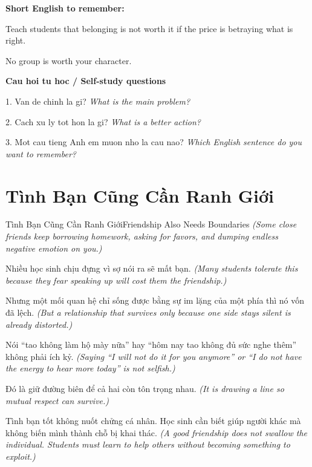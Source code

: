 \begin{ghinhoanh}
\textbf{Short English to remember:}

Teach students that belonging is not worth it if the price is betraying what is right.

No group is worth your character.

\end{ghinhoanh}

\begin{tuhocnhanh}
\textbf{Cau hoi tu hoc / Self-study questions}

1. Van de chinh la gi? \textit{What is the main problem?}

2. Cach xu ly tot hon la gi? \textit{What is a better action?}

3. Mot cau tieng Anh em muon nho la cau nao? \textit{Which English sentence do you want to remember?}
\end{tuhocnhanh}
\ngancach

\section{Tình Bạn Cũng Cần Ranh Giới}
\begin{truyen}{Tình Bạn Cũng Cần Ranh Giới}{Friendship Also Needs Boundaries}
\textit{(Some close friends keep borrowing homework, asking for favors, and dumping endless negative emotion on you.)}

Nhiều học sinh chịu đựng vì sợ nói ra sẽ mất bạn.
\textit{(Many students tolerate this because they fear speaking up will cost them the friendship.)}

Nhưng một mối quan hệ chỉ sống được bằng sự im lặng của một phía thì nó vốn đã lệch.
\textit{(But a relationship that survives only because one side stays silent is already distorted.)}

Nói ``tao không làm hộ mày nữa'' hay ``hôm nay tao không đủ sức nghe thêm'' không phải ích kỷ.
\textit{(Saying ``I will not do it for you anymore'' or ``I do not have the energy to hear more today'' is not selfish.)}

Đó là giữ đường biên để cả hai còn tôn trọng nhau.
\textit{(It is drawing a line so mutual respect can survive.)}

\end{truyen}

\begin{baihoc}
Tình bạn tốt không nuốt chửng cá nhân. Học sinh cần biết giúp người khác mà không biến mình thành chỗ bị khai thác.
\textit{(A good friendship does not swallow the individual. Students must learn to help others without becoming something to exploit.)}
\end{baihoc}

